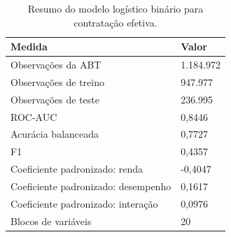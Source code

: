 \begin{table}
\caption{Resumo do modelo logístico binário para contratação efetiva.}
\label{tab:tabela_logit_binario_principal_geral_holdout_80_20_e5}
\begin{tabular}{ll}
\toprule
Medida & Valor \\
\midrule
Observações da ABT & 1.184.972 \\
Observações de treino & 947.977 \\
Observações de teste & 236.995 \\
ROC-AUC & 0,8446 \\
Acurácia balanceada & 0,7727 \\
F1 & 0,4357 \\
Coeficiente padronizado: renda & -0,4047 \\
Coeficiente padronizado: desempenho & 0,1617 \\
Coeficiente padronizado: interação & 0,0976 \\
Blocos de variáveis & 20 \\
\bottomrule
\end{tabular}
\end{table}
